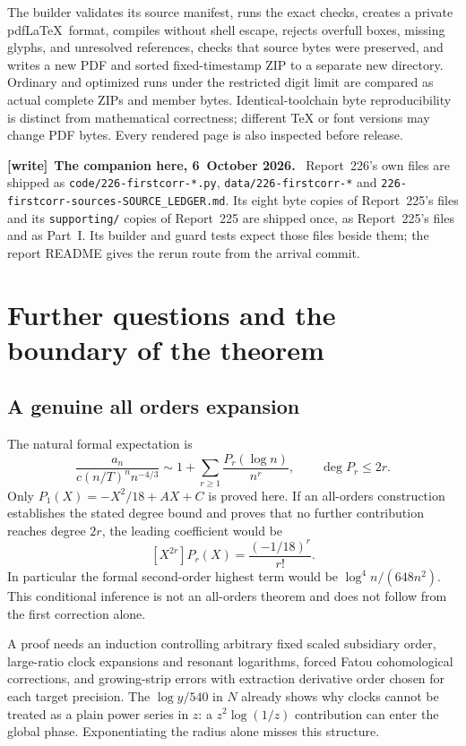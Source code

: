 \documentclass[11pt,letterpaper]{article}
\theoremstyle{remark}\newtheorem{remark}[theorem]{Remark}
\newcommand{\file}[1]{\nolinkurl{#1}}
\newenvironment{writenote}[1][]{\par\smallskip\begingroup\small
 \noindent\textbf{[write]}\if\relax\detokenize{#1}\relax\else~\textbf{#1.}\fi\ }%
 {\par\endgroup\smallskip}
\begin{document}
The builder validates its source manifest, runs the exact checks, creates a private pdf\LaTeX\ format, compiles without shell escape, rejects overfull boxes, missing glyphs, and unresolved references, checks that source bytes were preserved, and writes a new PDF and sorted fixed-timestamp ZIP to a separate new directory. Ordinary and optimized runs under the restricted digit limit are compared as actual complete ZIPs and member bytes. Identical-toolchain byte reproducibility is distinct from mathematical correctness; different TeX or font versions may change PDF bytes. Every rendered page is also inspected before release.

\begin{writenote}[The companion here, 6~October 2026]
Report~226's own files are shipped as \file{code/226-firstcorr-*.py}, \file{data/226-firstcorr-*} and \file{226-firstcorr-sources-SOURCE_LEDGER.md}. Its eight byte copies of Report~225's files and its \file{supporting/} copies of Report~225 are shipped once, as Report~225's files and as Part~I. Its builder and guard tests expect those files beside them; the report README gives the rerun route from the arrival commit.
\end{writenote}

\section{Further questions and the boundary of the theorem}\label{ied:corr:sec:further}
\subsection{A genuine all orders expansion}\label{ied:corr:sub:allorders}
The natural formal expectation is
\[
 \frac{a_n}{c(n/T)^nn^{-4/3}}
 \sim1+\sum_{r\ge1}\frac{P_r(\log n)}{n^r},\qquad \deg P_r\le2r.
\]
Only $P_1(X)=-X^2/18+AX+C$ is proved here. If an all-orders construction establishes the stated degree bound and proves that no further contribution reaches degree $2r$, the leading coefficient would be
\[
 [X^{2r}]P_r(X)=\frac{(-1/18)^r}{r!}.
\]
In particular the formal second-order highest term would be $\log^4n/(648n^2)$. This conditional inference is not an all-orders theorem and does not follow from the first correction alone.

A proof needs an induction controlling arbitrary fixed scaled subsidiary order, large-ratio clock expansions and resonant logarithms, forced Fatou cohomological corrections, and growing-strip errors with extraction derivative order chosen for each target precision. The $\log y/540$ in $N$ already shows why clocks cannot be treated as a plain power series in $z$: a $z^2\log(1/z)$ contribution can enter the global phase. Exponentiating the radius alone misses this structure.
\end{document}
